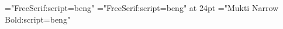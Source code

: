 
\usepackage{fontspec}
\font\serif="FreeSerif:script=beng"
\font\serifbb="FreeSerif:script=beng" at 24pt
\font{}="Mukti Narrow Bold:script=beng"
